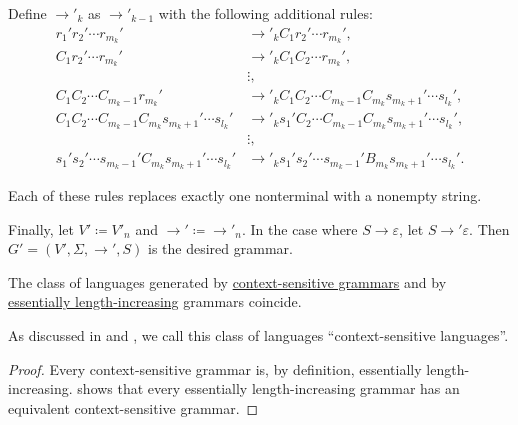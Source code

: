 \begin{algorithm}
\begin{thmenum}
    Define \( \to'_k \) as \( \to'_{k-1} \) with the following additional rules:
    \begin{align*}
      r_1' r_2' \cdots r_{m_k}'                                      &\to'_k C_1 r_2' \cdots r_{m_k}', \\
      C_1 r_2' \cdots r_{m_k}'                                       &\to'_k C_1 C_2 \cdots r_{m_k}', \\
                                                                     &\vdots, \\
      C_1 C_2 \cdots C_{m_k-1} r_{m_k}'                              &\to'_k C_1 C_2 \cdots C_{m_k-1} C_{m_k} s_{m_k+1}' \cdots s_{l_k}', \\
      C_1 C_2 \cdots C_{m_k-1} C_{m_k} s_{m_k+1}' \cdots s_{l_k}'    &\to'_k s_1' C_2 \cdots C_{m_k-1} C_{m_k} s_{m_k+1}' \cdots s_{l_k}', \\
                                                                     &\vdots, \\
      s_1' s_2' \cdots s_{m_k-1}' C_{m_k} s_{m_k+1}' \cdots s_{l_k}' &\to'_k s_1' s_2' \cdots s_{m_k-1}' B_{m_k} s_{m_k+1}' \cdots s_{l_k}'.
    \end{align*}

    Each of these rules replaces exactly one nonterminal with a nonempty string.

     Finally, let \( V' \coloneqq V'_n \) and \( {\to'} \coloneqq {\to'_n} \). In the case where \( S \to \varepsilon \), let \( S \to' \varepsilon \). Then \( G' = (V', \Sigma, \to', S) \) is the desired grammar.
  \end{thmenum}
\end{algorithm}

\begin{proposition}\label{thm:context_sensitive_languages}
  The class of languages generated by \hyperref[def:chomsky_hierarchy/context_sensitive]{context-sensitive grammars} and by \hyperref[def:length_increasing_grammar]{essentially length-increasing} grammars coincide.
\end{proposition}
\begin{comments}
  \item As discussed in  and , we call this class of languages \enquote{context-sensitive languages}.
\end{comments}
\begin{proof}
  Every context-sensitive grammar is, by definition, essentially length-increasing.  shows that every essentially length-increasing grammar has an equivalent context-sensitive grammar.
\end{proof}

